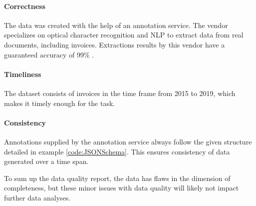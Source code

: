 \paragraph{Correctness}
The data was created with the help of an annotation service. The vendor specializes on optical character recognition and \acf{NLP} to extract data from real documents, including invoices. Extractions results by this vendor have a guaranteed accuracy of 99\% \cite{scaleaiScaleDocumentAI}.
\paragraph{Timeliness}
The dataset consists of invoices in the time frame from 2015 to 2019, which makes it timely enough for the task.
\paragraph{Consistency}
 Annotations supplied by the annotation service always follow the given structure detailed in example \ref{code:JSONSchema}. This ensures consistency of data generated over a time span.
 
 To sum up the data quality report, the data has flaws in the dimension of completeness, but these minor issues with data quality will likely not impact further data analyses.